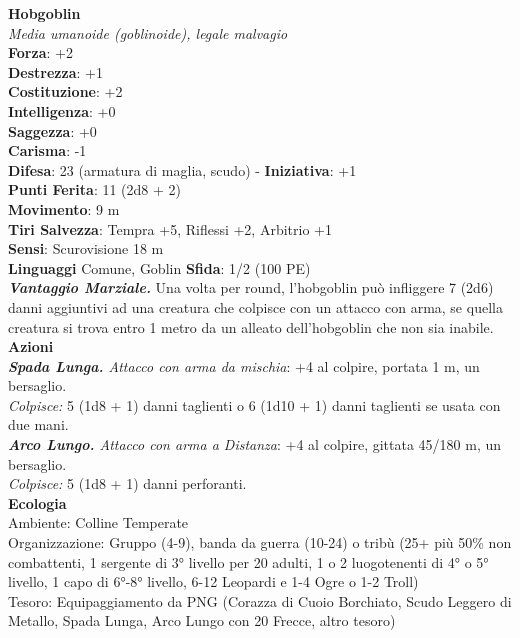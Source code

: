 \begin{multicols}{2}
\medskip\textbf{Hobgoblin}\\
\emph{Media umanoide (goblinoide), legale malvagio}\\
\textbf{Forza}: +2\\
\textbf{Destrezza}: +1\\
\textbf{Costituzione}: +2\\
\textbf{Intelligenza}: +0\\
\textbf{Saggezza}: +0\\
\textbf{Carisma}: -1\\
\textbf{Difesa}: 23 (armatura di maglia, scudo) - \textbf{Iniziativa}: +1\\
\textbf{Punti Ferita}: 11 (2d8 + 2)\\
\textbf{Movimento}: 9 m\\
\textbf{Tiri Salvezza}: Tempra +5, Riflessi +2, Arbitrio +1\\
\textbf{Sensi}: Scurovisione 18 m\\
\textbf{Linguaggi} Comune, Goblin \textbf{Sfida}: 1/2 (100 PE)\smallskip\\
\emph{\textbf{Vantaggio Marziale.}} Una volta per round, l'hobgoblin può infliggere 7 (2d6) danni aggiuntivi ad una creatura che colpisce con un attacco con arma, se quella creatura si trova entro 1 metro da un alleato dell'hobgoblin che non sia inabile.\\
\smallskip\textbf{Azioni}\\
\emph{\textbf{Spada Lunga.} Attacco con arma da mischia}: +4 al colpire, portata 1 m, un bersaglio.\\
\emph{Colpisce:} 5 (1d8 + 1) danni taglienti o 6 (1d10 + 1) danni taglienti se usata con due mani.\\
\emph{\textbf{Arco Lungo.} Attacco con arma a Distanza}: +4 al colpire, gittata 45/180 m, un bersaglio.\\
\emph{Colpisce:} 5 (1d8 + 1) danni perforanti.\\
\textbf{Ecologia}\\
Ambiente: Colline Temperate\\
Organizzazione: Gruppo (4-9), banda da guerra (10-24) o tribù (25+ più 50\% non combattenti, 1 sergente di 3° livello per 20 adulti, 1 o 2 luogotenenti di 4° o 5° livello, 1 capo di 6°-8° livello, 6-12 Leopardi e 1-4 Ogre o 1-2 Troll)\\
Tesoro: Equipaggiamento da PNG (Corazza di Cuoio Borchiato, Scudo Leggero di Metallo, Spada Lunga, Arco Lungo con 20 Frecce, altro tesoro)\\

\end{multicols}
